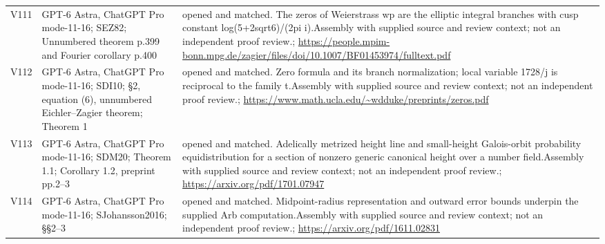 \documentclass[11pt,a4paper]{article}
\theoremstyle{plain}
\theoremstyle{definition}
\begin{document}
\begin{longtable}{@{}L{.08\linewidth}L{.31\linewidth}L{.56\linewidth}@{}}
V111 & GPT-6 Astra, ChatGPT Pro mode-11-16; S\newline EZ82; Unnumbered theorem p.399 and Fourier corollary p.400 & opened and matched. The zeros of Weierstrass wp are the elliptic integral branches with cusp constant log(5+2sqrt6)/\allowbreak{}(2pi i).\newline Assembly with supplied source and review context; not an independent proof review.\newline {}; \url{https://people.mpim-bonn.mpg.de/zagier/files/doi/10.1007/BF01453974/fulltext.pdf}\\
V112 & GPT-6 Astra, ChatGPT Pro mode-11-16; S\newline DI10; §2, equation (6), unnumbered Eichler--Zagier theorem; Theorem 1 & opened and matched. Zero formula and its branch normalization; local variable 1728/\allowbreak{}j is reciprocal to the family t.\newline Assembly with supplied source and review context; not an independent proof review.\newline {}; \url{https://www.math.ucla.edu/~wdduke/preprints/zeros.pdf}\\
V113 & GPT-6 Astra, ChatGPT Pro mode-11-16; S\newline DM20; Theorem 1.1; Corollary 1.2, preprint pp.2--3 & opened and matched. Adelically metrized height line and small-height Galois-orbit probability equidistribution for a section of nonzero generic canonical height over a number field.\newline Assembly with supplied source and review context; not an independent proof review.\newline {}; \url{https://arxiv.org/pdf/1701.07947}\\
V114 & GPT-6 Astra, ChatGPT Pro mode-11-16; S\newline Johansson2016; §§2--3 & opened and matched. Midpoint-radius representation and outward error bounds underpin the supplied Arb computation.\newline Assembly with supplied source and review context; not an independent proof review.\newline {}; \url{https://arxiv.org/pdf/1611.02831}\\

\end{longtable}
\end{document}
